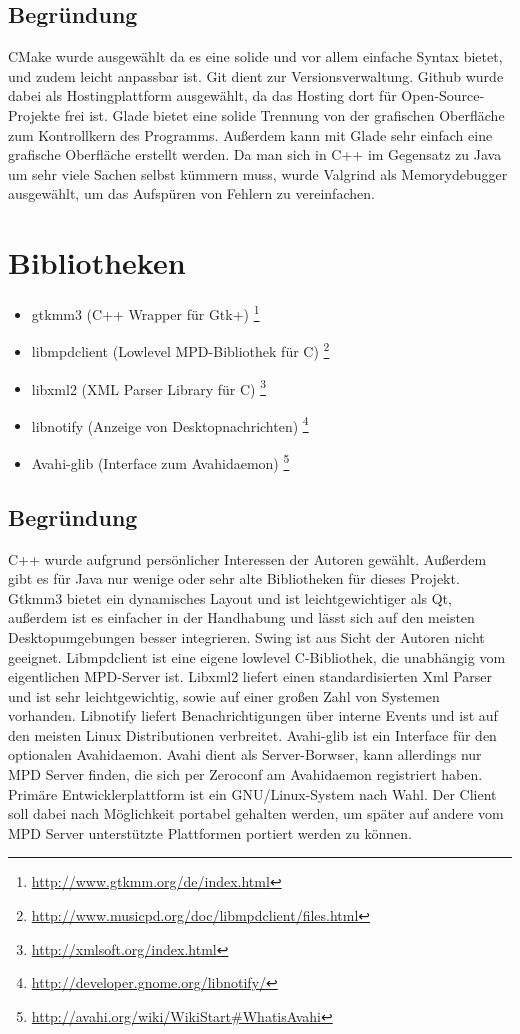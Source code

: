 \subsection{Begründung}
CMake wurde ausgewählt da es eine solide und vor allem einfache Syntax bietet, und zudem leicht anpassbar ist. 
Git dient zur Versionsverwaltung. Github wurde dabei als Hostingplattform ausgewählt, da das Hosting dort für Open-Source-Projekte
frei ist. Glade bietet eine solide Trennung von der grafischen  Oberfläche zum Kontrollkern des Programms. Außerdem kann mit Glade sehr
einfach eine grafische Oberfläche erstellt werden. Da man sich in C++ im Gegensatz zu Java um sehr viele Sachen selbst kümmern muss,
wurde Valgrind als Memorydebugger ausgewählt, um das Aufspüren von Fehlern zu vereinfachen.
\section{Bibliotheken}
\begin{itemize}
    \item gtkmm3 (C++ Wrapper für Gtk+) \footnote{\url{http://www.gtkmm.org/de/index.html}}
\item libmpdclient (Lowlevel MPD-Bibliothek für C) \footnote{\url{http://www.musicpd.org/doc/libmpdclient/files.html}}
\item libxml2 (XML Parser Library für C) \footnote{\url{http://xmlsoft.org/index.html}}
\item libnotify (Anzeige von Desktopnachrichten) \footnote{\url{http://developer.gnome.org/libnotify/}}
\item Avahi-glib (Interface zum Avahidaemon) \footnote{\url{http://avahi.org/wiki/WikiStart\#WhatisAvahi}}
\end{itemize}
\subsection{Begründung}
C++ wurde aufgrund persönlicher Interessen der Autoren gewählt. Außerdem gibt es für Java nur wenige
oder sehr alte Bibliotheken für dieses Projekt. Gtkmm3 bietet ein dynamisches Layout und ist
leichtgewichtiger als Qt, außerdem ist es einfacher in der Handhabung und lässt sich auf den meisten 
Desktopumgebungen besser integrieren. Swing ist aus Sicht der Autoren nicht geeignet.
Libmpdclient ist eine eigene lowlevel C-Bibliothek, die unabhängig vom eigentlichen MPD-Server ist.
Libxml2 liefert einen standardisierten Xml Parser und ist sehr leichtgewichtig, sowie auf einer großen Zahl von Systemen vorhanden.
Libnotify liefert Benachrichtigungen über interne Events und ist auf den meisten Linux
Distributionen verbreitet. Avahi-glib ist ein Interface für den optionalen Avahidaemon. Avahi 
dient als Server-Borwser, kann allerdings nur MPD Server finden, die sich per Zeroconf am Avahidaemon registriert
haben.
\\ 
Primäre Entwicklerplattform ist ein GNU/Linux-System nach Wahl. Der Client soll dabei nach Möglichkeit portabel gehalten werden, um später 
auf andere vom MPD Server unterstützte Plattformen portiert werden zu können.
